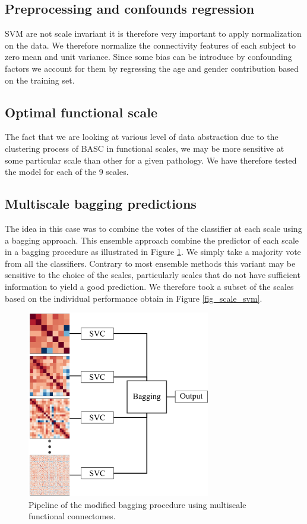 \documentclass[12pt,journal,compsoc]{IEEEtran}
\begin{document}
\subsection{Preprocessing and confounds regression}

SVM are not scale invariant it is therefore very important to apply normalization on the data. We therefore normalize the connectivity features of each subject to zero mean and unit variance. Since some bias can be introduce by confounding factors we account for them by regressing the age and gender contribution based on the training set.


\subsection{Optimal functional scale}
The fact that we are looking at various level of data abstraction due to the clustering process of BASC in functional scales, we may be more sensitive at some particular scale than other for a given pathology. We have therefore tested the model for each of the 9 scales.

\subsection{Multiscale bagging predictions}
The idea in this case was to combine the votes of the classifier at each scale using a bagging approach. This ensemble approach combine the predictor of each scale in a bagging procedure as illustrated in Figure \ref{fig_bagging_multiscale}. We simply take a majority vote from all the classifiers. Contrary to most ensemble methods this variant may be sensitive to the choice of the scales, particularly scales that do not have sufficient information to yield a good prediction. We therefore took a subset of the scales based on the individual performance obtain in Figure \ref{fig_scale_svm}.

\begin{figure}[h]
\centering
\includegraphics[width=8cm]{bagging_multiscale.png}
\caption{Pipeline of the modified bagging procedure using multiscale functional connectomes.}
\label{fig_bagging_multiscale}
\end{figure}
\end{document}
